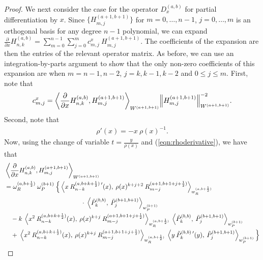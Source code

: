 \documentclass[11pt, oneside]{article}   	%
\newcommand{\half}{\frac{1}{2}}
\newcommand{\pddx}{\frac{\partial}{\partial x}}
\newcommand{\hdop}{H}
\newcommand{\hdopnkab}{\hdop_{n,k}^{(a,b)}}
\newcommand{\jac}{{\tilde P}}
\newcommand{\genjac}{R}
\newcommand{\genjacnmk}{\genjac_{n-k}}
\newcommand{\genjacmmj}{\genjac_{m-j}}
\newcommand{\genjacw}{w_\genjac}
\newcommand{\jacw}{w_P}
\newcommand{\normgenjac}{\omega_\genjac}
\newcommand{\normjac}{\omega_P}
\begin{document}
\begin{proof}
We next consider the case for the operator $D_x^{(a,b)}$ for partial differentiation by $x$. Since $\{\hdop^{(a+1, b+1)}_{m,j}\}$ for $m = 0,\dots,n-1$, $j = 0,\dots,m$ is an orthogonal basis for any degree $n-1$ polynomial, we can expand $\pddx \hdopnkab = \sum_{m=0}^{n-1} \sum_{j=0}^m c_{m,j}^x \: \hdop^{(a+1, b+1)}_{m,j}$. The coefficients of the expansion are then the entries of the relevant operator matrix. As before, we can use an integration-by-parts argument to show that the only non-zero coefficients of this expansion are when $m = n-1, n-2$, $j = k, k-1, k-2$ and $0 \le j \le m$. First, note that
\begin{align*}
	c_{m,j}^x = {\ip<\pddx \hdopnkab, \hdop^{(a+1, b+1)}_{m,j} >_{W^{(a+1, b+1)}}}{\norm{\hdop^{(a+1, b+1)}_{m,j}}^{-2}_{W^{(a+1, b+1)}}}.
\end{align*}
Second, note that
\begin{align}
	\rho'(x) = -x \: \rho(x)^{-1}. \label{eqn:rhoderivative}
\end{align}
Now, using the change of variable $t= \frac{y}{\rho(x)}$ and (\ref{eqn:rhoderivative}), we have that
\begin{align*}
	&\ip<\pddx \hdopnkab, \hdop^{(a+1, b+1)}_{m,j} >_{W^{(a+1, b+1)}} \nonumber \\ 
	&= \normgenjac^{(a, b+\half)} \: \normjac^{(b+1)} \: \Big\{ \ip< x \: \genjacnmk^{(a, b+k+\half) \: \prime} (x), \: \rho(x)^{k+j+2} \: \genjacmmj^{(a+1, b+1+j+\half)} >_{\genjacw^{(a, b+\half)}} \\ 
	&\quad \quad \quad \quad \quad \quad \quad \quad \quad \quad \quad \quad \cdot \: \ip< \jac_k^{(b,b)}, \: \jac_j^{(b+1,b+1)} >_{\jacw^{(b+1)}}  \nonumber \\ 
	& \quad - k \: \ip< x^2 \: \genjacnmk^{(a, b+k+\half)}(x), \: \rho(x)^{k+j} \: \genjacmmj^{(a+1, b+1+j+\half)} >_{\genjacw^{(a, b+\half)}} 
		\: \ip< \jac_k^{(b,b)}, \: \jac_j^{(b+1,b+1)} >_{\jacw^{(b+1)}}  \nonumber \\ 
	& \quad + \: \ip< x^2 \: \genjacnmk^{(a, b+k+\half)}(x), \: \rho(x)^{k+j} \: \genjacmmj^{(a+1, b+1+j+\half)} >_{\genjacw^{(a, b+\half)}} 
		\: \ip< y \: \jac_k^{(b,b) \: \prime} (y), \: \jac_j^{(b+1,b+1)} >_{\jacw^{(b+1)}} \Big\}
\end{align*}


\end{proof}
\end{document}
